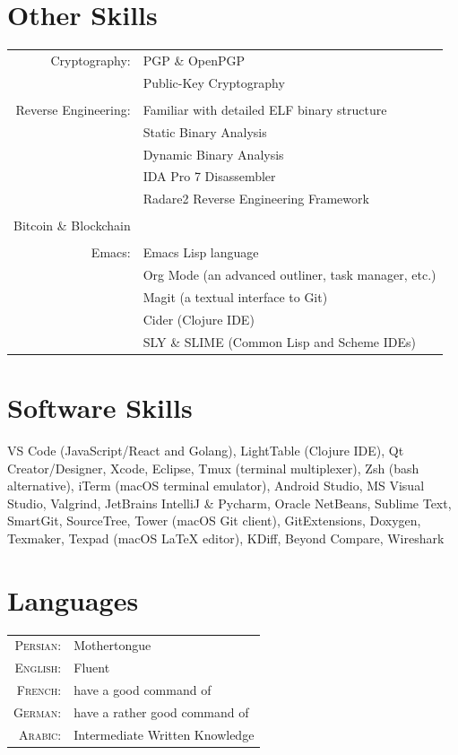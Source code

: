 \documentclass[a4paper,10pt]{article}
\begin{document}
\section{Other Skills}
\begin{tabular}{rl}
Cryptography:
	& PGP \& OpenPGP\\
	& Public-Key Cryptography\\
	\\
Reverse Engineering:
	& Familiar with detailed ELF binary structure\\
	& Static Binary Analysis\\
	& Dynamic Binary Analysis\\
	& IDA Pro 7 Disassembler\\
	& Radare2 Reverse Engineering Framework\\
	\\
Bitcoin \& Blockchain\\
	\\
Emacs:
	& Emacs Lisp language\\
	& Org Mode (an advanced outliner, task manager, etc.)\\
	& Magit (a textual interface to Git)\\
	& Cider (Clojure IDE)\\
	& SLY \& SLIME (Common Lisp and Scheme IDEs)\\
\end{tabular}

\section{Software Skills}
VS Code (JavaScript/React and Golang), LightTable (Clojure IDE),
Qt Creator/Designer, Xcode, Eclipse, Tmux (terminal multiplexer), Zsh (bash alternative), iTerm (macOS terminal emulator), Android Studio, MS Visual Studio, Valgrind, JetBrains IntelliJ \& Pycharm, Oracle NetBeans, Sublime Text, SmartGit, SourceTree, Tower (macOS Git client), GitExtensions, Doxygen, Texmaker, Texpad (macOS {\fb \LaTeX} editor), KDiff, Beyond Compare, Wireshark

\section{Languages}
\begin{tabular}{rl}
\textsc{Persian:} & Mothertongue\\
\textsc{English:} & Fluent\\
\textsc{French:} & have a good command of\\
\textsc{German:} & have a rather good command of\\
\textsc{Arabic:} & Intermediate Written Knowledge
\end{tabular}
\end{document}
